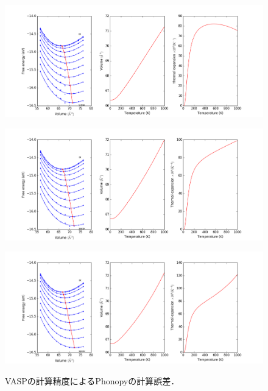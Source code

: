 \begin{figure}[htbp]
 \begin{minipage}[b]{1.0\linewidth}
  \centering
  \includegraphics[keepaspectratio, scale=0.45]
  {../image/figure_1.png}
  \label{phonopy1}
 \end{minipage}
  \begin{minipage}[b]{1.0\linewidth}
  \centering
  \includegraphics[keepaspectratio, scale=0.45]
  {../image/figure_2.png}
  \label{phonopy2}
 \end{minipage}
   \begin{minipage}[b]{1.0\linewidth}
  \centering
  \includegraphics[keepaspectratio, scale=0.45]
  {../image/figure_3.png}
  \label{phonopy3}
 \end{minipage}
 \caption{VASPの計算精度によるPhonopyの計算誤差．}\label{fig:phonopy}
\end{figure}



